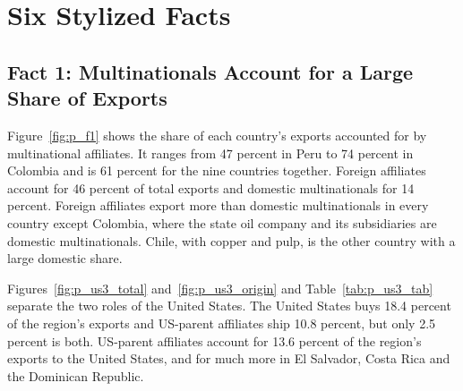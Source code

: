\documentclass[11pt,a4paper]{article}
\begin{document}
\section{Six Stylized Facts}\label{sec:facts}

\subsection{Fact 1: Multinationals Account for a Large Share of Exports}
Figure~\ref{fig:p_f1} shows the share of each country's exports accounted for by multinational
affiliates. It ranges from 47 percent in Peru to 74 percent in Colombia and is 61 percent for the
nine countries together. Foreign affiliates account for 46 percent of total exports and domestic
multinationals for 14 percent. Foreign affiliates export more than domestic multinationals in every
country except Colombia, where the state oil company and its subsidiaries are domestic
multinationals. Chile, with copper and pulp, is the other country with a large domestic share.

Figures~\ref{fig:p_us3_total} and~\ref{fig:p_us3_origin} and Table~\ref{tab:p_us3_tab} separate
the two roles of the United States. The United States buys 18.4 percent of the region's exports
and US-parent affiliates ship 10.8 percent, but only 2.5 percent is both. US-parent affiliates
account for 13.6 percent of the region's exports to the United States, and for much more in El
Salvador, Costa Rica and the Dominican Republic.
\end{document}
